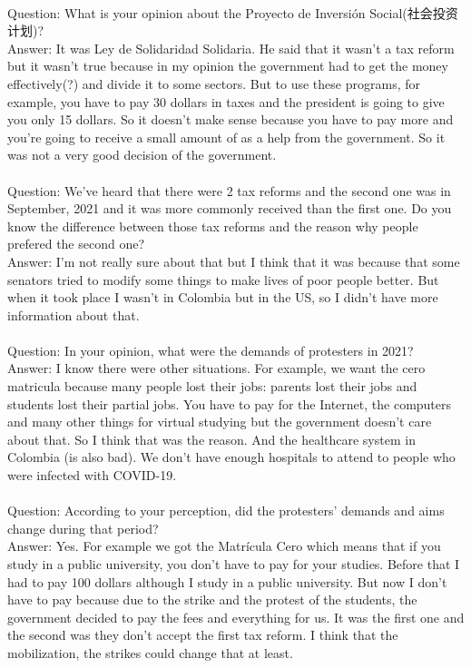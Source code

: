 \documentclass{phyasgn}\usepackage{nag}
\begin{document}
\\
Question: What is your opinion about the Proyecto de Inversión Social(社会投资计划)?\\
Answer: It was Ley de Solidaridad Solidaria. He said that it wasn’t a tax reform but it wasn’t true because in my opinion the government had to get the money effectively(?) and divide it to some sectors. But to use these programs, for example, you have to pay 30 dollars in taxes and the president is going to give you only 15 dollars. So it doesn’t make sense because you have to pay more and you’re going to receive a small amount of as a help from the government. So it was not a very good decision of the government.\\
\\
Question: We’ve heard that there were 2 tax reforms and the second one was in September, 2021 and it was more commonly received than the first one. Do you know the difference between those tax reforms and the reason why people prefered the second one?\\
Answer: I’m not really sure about that but I think that it was because that some senators tried to modify some things to make lives of poor people better. But when it took place I wasn’t in Colombia but in the US, so I didn’t have more information about that. \\
\\
Question: In your opinion, what were the demands of protesters in 2021?\\
Answer: I know there were other situations. For example, we want the cero matricula because many people lost their jobs: parents lost their jobs and students lost their partial jobs. You have to pay for the Internet, the computers and many other things for virtual studying but the government doesn’t care about that. So I think that was the reason. And the healthcare system in Colombia (is also bad). We don’t have enough hospitals to attend to people who were infected with COVID-19. \\
\\
Question: According to your perception, did the protesters’ demands and aims change during that period?\\
Answer: Yes. For example we got the Matrícula Cero which means that if you study in a public university, you don’t have to pay for your studies. Before that I had to pay 100 dollars although I study in a public university. But now I don’t have to pay because due to the strike and the protest of the students, the government decided to pay the fees and everything for us. It was the first one and the second was they don’t accept the first tax reform. I think that the mobilization, the strikes could change that at least. \\
\end{document}
